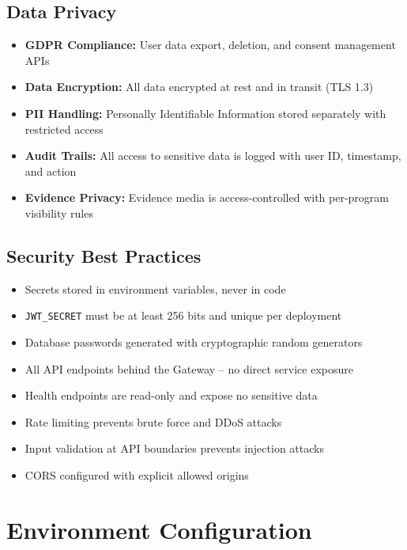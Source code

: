 \subsection{Data Privacy}

\begin{itemize}
  \item \textbf{GDPR Compliance:} User data export, deletion, and consent management APIs
  \item \textbf{Data Encryption:} All data encrypted at rest and in transit (TLS 1.3)
  \item \textbf{PII Handling:} Personally Identifiable Information stored separately with restricted access
  \item \textbf{Audit Trails:} All access to sensitive data is logged with user ID, timestamp, and action
  \item \textbf{Evidence Privacy:} Evidence media is access-controlled with per-program visibility rules
\end{itemize}

\subsection{Security Best Practices}

\begin{itemize}
  \item Secrets stored in environment variables, never in code
  \item \texttt{JWT\_SECRET} must be at least 256 bits and unique per deployment
  \item Database passwords generated with cryptographic random generators
  \item All API endpoints behind the Gateway -- no direct service exposure
  \item Health endpoints are read-only and expose no sensitive data
  \item Rate limiting prevents brute force and DDoS attacks
  \item Input validation at API boundaries prevents injection attacks
  \item CORS configured with explicit allowed origins
\end{itemize}

\clearpage

\section{Environment Configuration}

